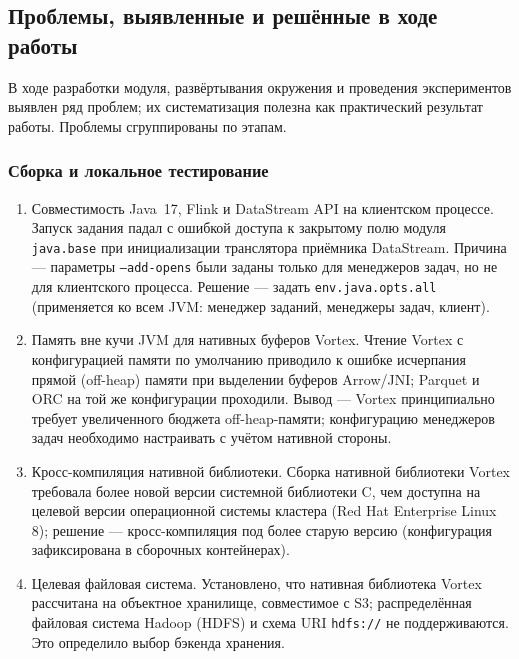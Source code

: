 \subsection{Проблемы, выявленные и решённые в ходе работы}
\label{subsec:issues}

В ходе разработки модуля, развёртывания окружения и проведения экспериментов
выявлен ряд проблем; их систематизация полезна как практический результат работы.
Проблемы сгруппированы по этапам.

\subsubsection{Сборка и локальное тестирование}

\begin{enumerate}
    \item Совместимость Java~17, Flink и DataStream API на клиентском
        процессе. Запуск задания падал с ошибкой доступа к закрытому полю модуля
        \texttt{java.base} при инициализации транслятора приёмника DataStream.
        Причина --- параметры \texttt{--add-opens} были заданы только для менеджеров
        задач, но не для клиентского процесса. Решение --- задать
        \texttt{env.java.opts.all} (применяется ко всем JVM: менеджер заданий,
        менеджеры задач, клиент).
    \item Память вне кучи JVM для нативных буферов Vortex. Чтение Vortex с
        конфигурацией памяти по умолчанию приводило к ошибке исчерпания прямой
        (off-heap) памяти при выделении буферов Arrow/JNI; Parquet и ORC на той же
        конфигурации проходили. Вывод --- Vortex принципиально требует увеличенного
        бюджета off-heap-памяти; конфигурацию менеджеров задач необходимо настраивать
        с учётом нативной стороны.
    \item Кросс-компиляция нативной библиотеки. Сборка нативной библиотеки
        Vortex требовала более новой версии системной библиотеки C, чем доступна на
        целевой версии операционной системы кластера (Red Hat Enterprise Linux 8); решение --- кросс-компиляция
        под более старую версию (конфигурация зафиксирована в сборочных контейнерах).
    \item Целевая файловая система. Установлено, что нативная библиотека
        Vortex рассчитана на объектное хранилище, совместимое с S3; распределённая
        файловая система Hadoop (HDFS) и схема URI \texttt{hdfs://} не поддерживаются.
        Это определило выбор бэкенда хранения.
\end{enumerate}

